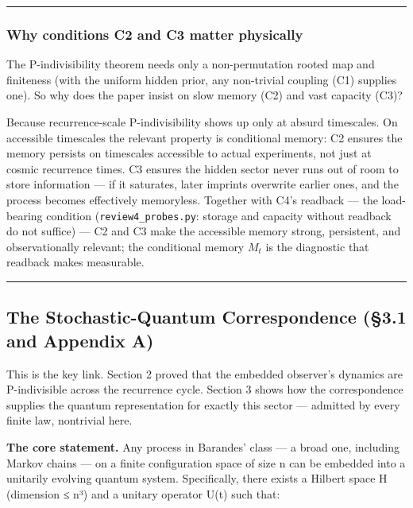 \documentclass[
]{article}
\begin{document}
\begin{center}\rule{0.5\linewidth}{0.5pt}\end{center}

\hypertarget{why-conditions-c2-and-c3-matter-physically}{%
\subsubsection{Why conditions C2 and C3 matter
physically}\label{why-conditions-c2-and-c3-matter-physically}}

The P-indivisibility theorem needs only a non-permutation rooted map and
finiteness (with the uniform hidden prior, any non-trivial coupling (C1)
supplies one). So why does the paper insist on slow memory (C2) and vast
capacity (C3)?

Because recurrence-scale P-indivisibility shows up only at absurd
timescales. On accessible timescales the relevant property is
conditional memory: C2 ensures the memory persists on timescales
accessible to actual experiments, not just at cosmic recurrence times.
C3 ensures the hidden sector never runs out of room to store information
--- if it saturates, later imprints overwrite earlier ones, and the
process becomes effectively memoryless. Together with C4's readback ---
the load-bearing condition (\texttt{review4\_probes.py}: storage and
capacity without readback do not suffice) --- C2 and C3 make the
accessible memory strong, persistent, and observationally relevant; the
conditional memory \(M_t\) is the diagnostic that readback makes
measurable.

\begin{center}\rule{0.5\linewidth}{0.5pt}\end{center}

\hypertarget{the-stochastic-quantum-correspondence-3.1-and-appendix-a}{%
\subsection{The Stochastic-Quantum Correspondence (§3.1 and Appendix
A)}\label{the-stochastic-quantum-correspondence-3.1-and-appendix-a}}

This is the key link. Section 2 proved that the embedded observer's
dynamics are P-indivisible across the recurrence cycle. Section 3 shows
how the correspondence supplies the quantum representation for exactly
this sector --- admitted by every finite law, nontrivial here.

\textbf{The core statement.} Any process in Barandes' class --- a broad
one, including Markov chains --- on a finite configuration space of size
n can be embedded into a unitarily evolving quantum system.
Specifically, there exists a Hilbert space H (dimension ≤ n³) and a
unitary operator U(t) such that:
\end{document}
